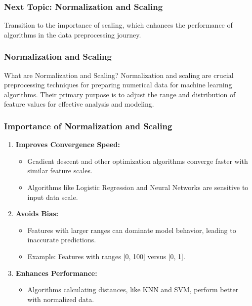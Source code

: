 \documentclass[aspectratio=169]{beamer}
\begin{document}
\begin{frame}[fragile]
    \frametitle{Next Topic: Normalization and Scaling}
    Transition to the importance of scaling, which enhances the performance of algorithms in the data preprocessing journey.
\end{frame}

\begin{frame}[fragile]
    \frametitle{Normalization and Scaling}
    \begin{block}{What are Normalization and Scaling?}
        Normalization and scaling are crucial preprocessing techniques for preparing numerical data for machine learning algorithms. 
        Their primary purpose is to adjust the range and distribution of feature values for effective analysis and modeling.
    \end{block}
\end{frame}

\begin{frame}[fragile]
    \frametitle{Importance of Normalization and Scaling}
    \begin{enumerate}
        \item \textbf{Improves Convergence Speed:}
            \begin{itemize}
                \item Gradient descent and other optimization algorithms converge faster with similar feature scales.
                \item Algorithms like Logistic Regression and Neural Networks are sensitive to input data scale.
            \end{itemize}
        \item \textbf{Avoids Bias:}
            \begin{itemize}
                \item Features with larger ranges can dominate model behavior, leading to inaccurate predictions.
                \item Example: Features with ranges [0, 100] versus [0, 1].
            \end{itemize}
        \item \textbf{Enhances Performance:}
            \begin{itemize}
                \item Algorithms calculating distances, like KNN and SVM, perform better with normalized data.
            \end{itemize}
    \end{enumerate}
\end{frame}
\end{document}
